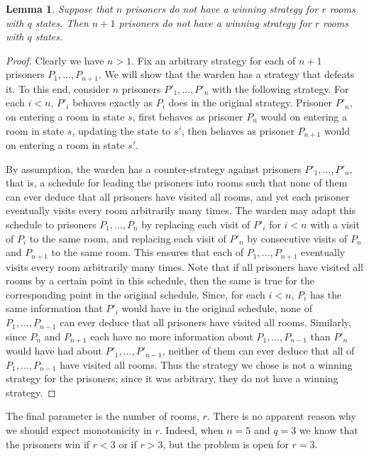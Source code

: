 \documentclass[a4paper,11pt]{extarticle}
\newtheorem{lemma}[theorem]{Lemma}
\theoremstyle{definition}
\theoremstyle{remark}
\begin{document}
	\begin{lemma}\label{monotonic}Suppose that $n$ prisoners do not have a winning strategy for $r$ rooms with $q$ states. Then $n+1$ prisoners do not have a winning strategy for $r$ rooms with $q$ states.
	\end{lemma}
	\begin{proof}Clearly we have $n>1$. Fix an arbitrary strategy for each of $n+1$ prisoners $P_1,\ldots, P_{n+1}$. We will show that the warden has a strategy that defeats it. To this end, consider $n$ prisoners $P'_1,\ldots, P'_n$ with the following strategy. For each $i<n$, $P'_i$ behaves exactly as $P_i$ does in the original strategy. Prisoner $P'_n$, on entering a room in state $s$, first behaves as prisoner $P_n$ would on entering a room in state $s$, updating the state to $s'$, then behaves as prisoner $P_{n+1}$ would on entering a room in state $s'$.
		
		By assumption, the warden has a counter-strategy against prisoners $P'_1,\ldots,P'_n$, that is, a schedule for leading the prisoners into rooms such that none of them can ever deduce that all prisoners have visited all rooms, and yet each prisoner eventually visits every room arbitrarily many times. The warden may adapt this schedule to prisoners $P_1,\ldots, P_n$ by replacing each visit of $P'_i$ for $i<n$ with a visit of $P_i$ to the same room, and replacing each visit of $P'_n$ by consecutive visits of $P_n$ and $P_{n+1}$ to the same room. This ensures that each of $P_1,\ldots, P_{n+1}$ eventually visits every room arbitrarily many times. Note that if all prisoners have visited all rooms by a certain point in this schedule, then the same is true for the corresponding point in the original schedule. Since, for each $i<n$, $P_i$ has the same information that $P'_i$ would have in the original schedule, none of $P_1,\ldots,P_{n-1}$ can ever deduce that all prisoners have visited all rooms. Similarly, since $P_n$ and $P_{n+1}$ each have no more information about $P_1,\ldots, P_{n-1}$ than $P'_n$ would have had about $P'_1,\ldots,P'_{n-1}$, neither of them can ever deduce that all of $P_1,\ldots,P_{n-1}$ have visited all rooms. Thus the strategy we chose is not a winning strategy for the prisoners; since it was arbitrary, they do not have a winning strategy.
	\end{proof}
	
	The final parameter is the number of rooms, $r$. There is no apparent reason why we should expect monotonicity in $r$. Indeed, when $n=5$ and $q=3$ we know that the prisoners win if $r<3$ or if $r>3$, but the problem is open for $r=3$.
	
\end{document}
